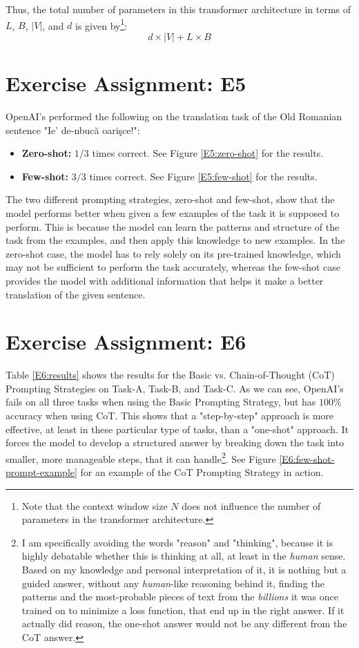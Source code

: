 \documentclass{article}
\begin{document}
Thus, the total number of parameters in this transformer architecture in terms of \(L\), \(B\), \(|V|\), and \(d\) is given by\footnote{Note that the context window size \(N\) does not influence the number of parameters in the transformer architecture.}:
\[
    d \times |V| + L \times B
\]

\section{Exercise Assignment: E5}\label{sec:e5}
OpenAI's  performed the following on the translation task of the Old Romanian sentence "Ie' de-nbucă oarişce!":
\begin{itemize}
    \item \textbf{Zero-shot:} $1/3$ times correct. See Figure \ref{E5:zero-shot} for the results.
    \item \textbf{Few-shot:} $3/3$ times correct. See Figure \ref{E5:few-shot} for the results.
\end{itemize}
The two different prompting strategies, zero-shot and few-shot, show that the model performs better when given a few examples of the task it is supposed to perform. This is because the model can learn the patterns and structure of the task from the examples, and then apply this knowledge to new examples. In the zero-shot case, the model has to rely solely on its pre-trained knowledge, which may not be sufficient to perform the task accurately, whereas the few-shot case provides the model with additional information that helps it make a better translation of the given sentence.

\section{Exercise Assignment: E6}\label{sec:e6}
Table \ref{E6:results} shows the results for the Basic vs. Chain-of-Thought (CoT) Prompting Strategies on Task-A, Task-B, and Task-C. As we can see, OpenAI's  fails on all three tasks when using the Basic Prompting Strategy, but has $100\%$ accuracy when using CoT. This shows that a "step-by-step" approach is more effective, at least in these particular type of tasks, than a "one-shot" approach. It forces the model to develop a structured answer by breaking down the task into smaller, more manageable steps, that it can handle\footnote{I am specifically avoiding the words "reason" and "thinking", because it is highly debatable whether this is thinking at all, at least in the \textit{human} sense. Based on my knowledge and personal interpretation of it, it is nothing but a guided answer, without any \textit{human}-like reasoning behind it, finding the patterns and the most-probable pieces of text from the \textit{billions} it was once trained on to minimize a loss function, that end up in the right answer. If it actually did reason, the one-shot answer would not be any different from the CoT answer.}. See Figure \ref{E6:few-shot-prompt-example} for an example of the CoT Prompting Strategy in action.
\end{document}
